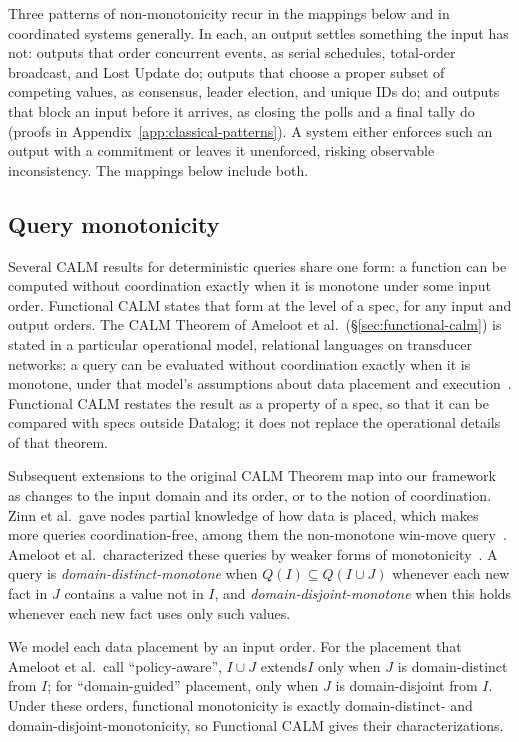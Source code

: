 \documentclass[sigconf]{cidr-2027}
\theoremstyle{remark}
\newcommand{\commitment}{commitment\xspace}
\newcommand{\inrel}{extends\xspace}          %
\begin{document}
Three patterns of non-monotonicity recur in the mappings below and in
coordinated systems generally. In each, an output settles something the input
has not: outputs that order concurrent events, as serial schedules,
total-order broadcast, and Lost Update do; outputs that choose a proper subset
of competing values, as consensus, leader election, and unique IDs do; and
outputs that block an input before it arrives, as closing the polls and a
final tally do (proofs in Appendix~\ref{app:classical-patterns}). \textcolor{reviewed}{A system either enforces such
an output with a \commitment or leaves it unenforced, risking observable
inconsistency.} The mappings below include both.

\subsection{Query monotonicity}
\label{sec:query-instance}

\textcolor{reviewed}{Several CALM results for deterministic queries share one form: a function can
be computed without coordination exactly when it is monotone under some input
order.} \textcolor{reviewed}{Functional CALM states that form at the level of a spec, for any input
and output orders.} The CALM Theorem of Ameloot et al.\ (\S\ref{sec:functional-calm}) is stated in
a particular operational model, relational languages on transducer networks: a query can be evaluated without
coordination exactly when it is monotone, under that model's assumptions about
data placement and execution~\cite{ameloot2013relational,ameloot2015weaker}. Functional CALM restates the result as a property of a spec, so that it can be
compared with specs outside Datalog; it does not replace the operational details
of that theorem.

Subsequent extensions to the original CALM Theorem map into our framework as
changes to the input domain and its order, or to the notion of coordination. Zinn et al.\ gave nodes partial knowledge of how data is placed, which makes
more queries coordination-free, among them the non-monotone win-move
query~\cite{zinn2012winmove}. Ameloot et al.\ characterized these queries by
weaker forms of monotonicity~\cite{ameloot2015weaker}. A query is
\emph{domain-distinct-monotone} when $Q(I)\subseteq Q(I\cup J)$ whenever each
new fact in $J$ contains a value not in $I$, and
\emph{domain-disjoint-monotone} when this holds whenever each new fact uses
only such values.

We model each data placement by an input order. For the placement that
Ameloot et al.\ call ``policy-aware'', $I\cup J$ \inrel $I$ only when $J$ is domain-distinct from $I$; for ``domain-guided''
placement, only when $J$ is domain-disjoint from $I$. Under these orders,
functional monotonicity is exactly domain-distinct- and
domain-disjoint-monotonicity, so Functional CALM gives their
characterizations.
\end{document}
